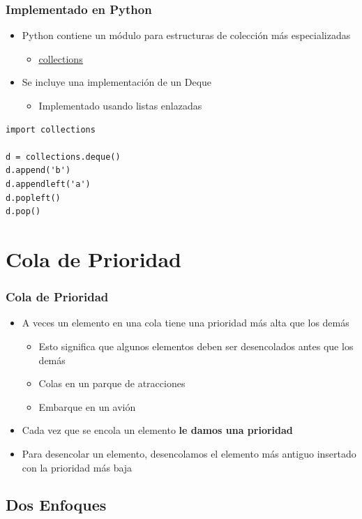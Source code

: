 \documentclass[11pt]{beamer}
\begin{document}
\begin{frame}[fragile]\frametitle{Implementado en Python}
\begin{itemize}
\item Python contiene un módulo para estructuras de colección más especializadas
    \begin{itemize}
    \item \href{https://docs.python.org/3/library/collections.html}{\color{blue}\underline{collections}}
    \end{itemize}
\item Se incluye una implementación de un Deque
    \begin{itemize}
    \item Implementado usando listas enlazadas
    \end{itemize}
\end{itemize}
\begin{lstlisting}
import collections

d = collections.deque()
d.append('b')
d.appendleft('a')
d.popleft()
d.pop()
\end{lstlisting}
\end{frame}


\section{Cola de Prioridad}

\begin{frame}\frametitle{Cola de Prioridad}
\begin{itemize}
\item A veces un elemento en una cola tiene una prioridad más alta que los demás
    \begin{itemize}
    \item Esto significa que algunos elementos deben ser desencolados antes que los demás
    \item Colas en un parque de atracciones
    \item Embarque en un avión
    \end{itemize}
\item Cada vez que se encola un elemento \textbf{le damos una prioridad}
\item Para desencolar un elemento, desencolamos el elemento más antiguo insertado con la prioridad más baja
\end{itemize}
\end{frame}

\subsection{Dos Enfoques}
\end{document}
